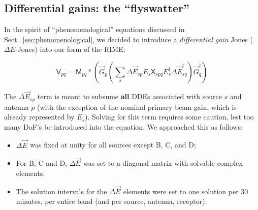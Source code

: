 \documentclass[]{aa}
\newcommand{\jones}[2]{\vec {#1}_{#2}}
\newcommand{\jonesT}[2]{\vec {#1}^\dagger_{#2}}
\newcommand{\coh}[2]{\mathsf{{#1}}_{{#2}}}
\begin{document}
\subsection{Differential gains: the ``flyswatter''\label{sec:diffgains}}

In the spirit of ``phenomenological'' equations discussed in Sect.~\ref{sec:phenomenological}, we decided to introduce a {\em differential gain} Jones ($\Delta E$-Jones) into our form of the RIME:

\begin{equation}\label{eq:3C147:de}
\coh{V}{pq} = \coh{M}{pq} \ast \left ( \jones{G}{p} \left( \sum_s \Delta\jones{E}{sp} E_s \coh{X}{spq} E^{\dagger}_s \Delta\jonesT{E}{sq} \right)  \jonesT{G}{q} \right )
\end{equation}

The $\Delta\jones{E}{sp}$ term is meant to subsume {\bf all} DDEs associated with source $s$ and antenna $p$ (with the exception of the nominal primary beam gain, which is already represented by $E_s$). Solving for this term requires some caution, lest too many DoF's be introduced into the equation. We approached this as follows:

\begin{itemize}
\item $\Delta\jones{E}{}$ was fixed at unity for all sources except B, C, and D;
\item For B, C and D, $\Delta\jones{E}{}$ was set to a diagonal matrix with solvable complex elements.
\item The solution intervals for the $\Delta\jones{E}{}$ elements were set to one solution per 30 minutes, per entire band (and per source, antenna, receptor).
\end{itemize}
\end{document}
